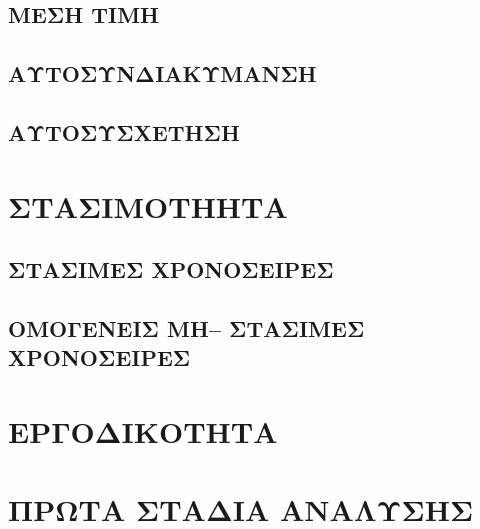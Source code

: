\subsection{ΜΕΣΗ ΤΙΜΗ}
\subsection{ΑΥΤΟΣΥΝΔΙΑΚΥΜΑΝΣΗ}
\subsection{ ΑΥΤΟΣΥΣΧΕΤΗΣΗ}
\section{ ΣΤΑΣΙΜΟΤΗΗΤΑ}
\subsection{ΣΤΑΣΙΜΕΣ ΧΡΟΝΟΣΕΙΡΕΣ}
\subsection{ΟΜΟΓΕΝΕΙΣ ΜΗ– ΣΤΑΣΙΜΕΣ ΧΡΟΝΟΣΕΙΡΕΣ}
\section{ΕΡΓΟΔΙΚΟΤΗΤΑ}
\section{ΠΡΩΤΑ ΣΤΑΔΙΑ ΑΝΑΛΥΣΗΣ}










\endinput
